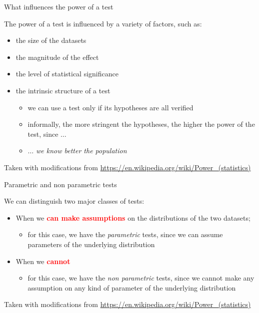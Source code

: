 \documentclass{beamer}
\begin{document}
\begin{frame}
{\centerline{What influences the power of a test}}

The power of a test is influenced by a variety of factors, such as:
\begin{itemize}
    \item the size of the datasets
    \item the magnitude of the effect
    \item the level of statistical significance
    \item the intrinsic structure of a test
    \begin{itemize}
        \item we can use a test only if its hypotheses are all verified
        \item informally, the more stringent the hypotheses, the higher the power of the test, since $\ldots$
        \item $\ldots$ \textit{we know better the population}
    \end{itemize}

\end{itemize}

\begin{center}
\tiny{Taken with modifications from \url{https://en.wikipedia.org/wiki/Power_(statistics)}}
\end{center}

\end{frame}


\begin{frame}
{\centerline{Parametric and non parametric tests}}

We can distinguish two major classes of tests:
\begin{itemize}
    \item When we \textcolor{red}{\bf can make assumptions} on the distributions of the two datasets;
    \begin{itemize}
    \item for this case, we have the \textit{parametric} tests, since we can assume parameters of the underlying distribution
    \end{itemize}
    \item When we \textcolor{red}{\bf cannot}
    \begin{itemize}
    \item for this case, we have the \textit{non parametric} tests, since we cannot make any assumption on any kind of parameter of the underlying distribution
\end{itemize}

\end{itemize}

\begin{center}
\tiny{Taken with modifications from \url{https://en.wikipedia.org/wiki/Power_(statistics)}}
\end{center}

\end{frame}
\end{document}
